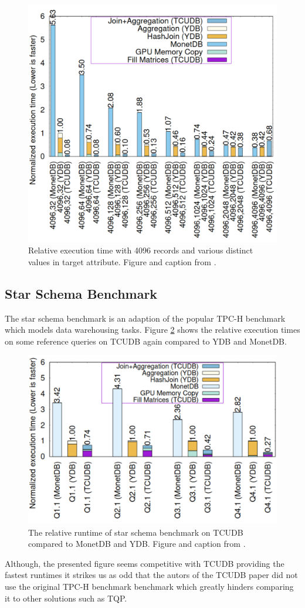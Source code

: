\documentclass{paper}
\begin{document}
		\begin{figure}
		\centering
		\includegraphics[width=0.9\linewidth]{bench2}
		\caption{Relative execution time with 4096 records and various distinct values in target attribute. Figure and caption from \cite{hu2021tcudb}.}
		\label{fig:bench2}
	\end{figure}
	
	\subsection{Star Schema Benchmark}
	The star schema benchmark \cite{o2009star} is an adaption of the popular TPC-H benchmark \cite{specification1993tpc} which models data warehousing tasks. Figure \ref{fig:bench4} shows the relative execution times on some reference queries on TCUDB again compared to YDB and MonetDB.
		\begin{figure}
		\centering
		\includegraphics[width=0.9\linewidth]{bench4}
		\caption{The relative runtime of star schema benchmark on TCUDB compared to MonetDB and YDB. Figure and caption from \cite{hu2021tcudb}.}
		\label{fig:bench4}
	\end{figure}
	Although, the presented figure seems competitive with TCUDB providing the fastest runtimes it strikes us as odd that the autors of the TCUDB paper did not use the original TPC-H benchmark \cite{specification1993tpc} benchmark which greatly hinders comparing it to other solutions such as TQP.
	
\end{document}
